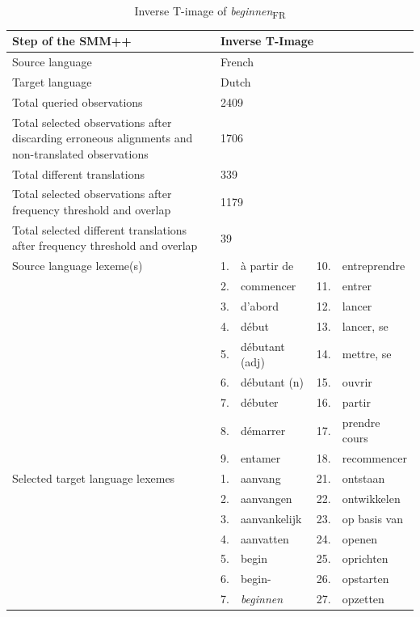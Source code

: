 \begin{table}
\caption{Inverse T-image of \textit{beginnen}\textsubscript{FR}\label{tab:3:9}}
\footnotesize
\begin{tabularx}{\textwidth}{p{}lXlX}
\lsptoprule
Step of the SMM++ & \multicolumn{4}{l}{Inverse T-Image}\\ \midrule
\rowcolor{lsLightGray} Source language & \multicolumn{4}{l}{French}\\
Target language & \multicolumn{4}{l}{Dutch}\\
\rowcolor{lsLightGray} Total queried observations & \multicolumn{4}{l}{ 2409}\\
Total selected observations after discarding erroneous alignments and non-translated observations & \multicolumn{4}{l}{ 1706}\\
\rowcolor{lsLightGray} Total different translations & \multicolumn{4}{l}{ 339}\\
Total selected observations after frequency threshold and overlap & \multicolumn{4}{l}{ 1179}\\
\rowcolor{lsLightGray} Total selected different translations after frequency threshold and overlap & \multicolumn{4}{l}{ 39}\\
Source language lexeme(s) & 1.& à partir de & 10.& entreprendre\\
& 2.& commencer & 11.& entrer\\
& 3.& d'abord & 12.& lancer\\
& 4.& début & 13.& lancer, se\\
& 5.& débutant (adj) & 14.& mettre, se\\
& 6.& débutant (n) & 15.& ouvrir\\
& 7.& débuter & 16.& partir\\
& 8.& démarrer & 17.& prendre cours\\
& 9.& entamer & 18.& recommencer \\
\rowcolor{lsLightGray} Selected target language lexemes & 1. & aanvang & 21.& ontstaan\\
\rowcolor{lsLightGray}& 2.& aanvangen & 22.& ontwikkelen\\
\rowcolor{lsLightGray}& 3.& aanvankelijk & 23.& op basis van\\
\rowcolor{lsLightGray}& 4.& aanvatten & 24.& openen\\
\rowcolor{lsLightGray}& 5.& begin & 25.& oprichten\\
\rowcolor{lsLightGray}& 6.& begin- & 26.& opstarten\\
\rowcolor{lsLightGray}& 7.& \textit{beginnen} & 27.& opzetten\\

\end{tabularx}
\end{table}
